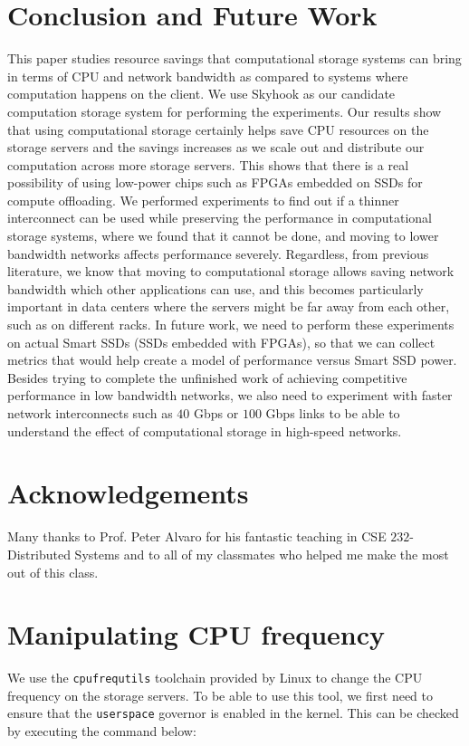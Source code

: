\documentclass[11pt]{article}
\newcommand{\code}[1]{\colorbox{light-gray}{\texttt{#1}}}
\begin{document}
\section{Conclusion and Future Work}
\label{sec:future-and-concl}
This paper studies resource savings that computational storage systems can bring in terms of CPU and network bandwidth as compared to systems where computation happens on the client. We use Skyhook as our candidate computation storage system for performing the experiments. Our results show that using computational storage certainly helps save CPU resources on the storage servers and the savings increases as we scale out and distribute our computation across more storage servers. This shows that there is a real possibility of using low-power chips such as FPGAs embedded on SSDs for compute offloading. We performed experiments to find out if a thinner interconnect can be used while preserving the performance in computational storage systems, where we found that it cannot be done, and moving to lower bandwidth networks affects performance severely. Regardless, from previous literature, we know that moving to computational storage allows saving network bandwidth which other applications can use, and this becomes particularly important in data centers where the servers might be far away from each other, such as on different racks. In future work, we need to perform these experiments on actual Smart SSDs (SSDs embedded with FPGAs), so that we can collect metrics that would help create a model of performance versus Smart SSD power. Besides trying to complete the unfinished work of achieving competitive performance in low bandwidth networks, we also need to experiment with faster network interconnects such as $40$ Gbps or $100$ Gbps links to be able to understand the effect of computational storage in high-speed networks.

\section{Acknowledgements}
Many thanks to Prof. Peter Alvaro for his fantastic teaching in CSE $232$-Distributed Systems and to all of my classmates who helped me make the most out of this class.




\appendix

\section{Manipulating CPU frequency}
\label{sec:app-cpu}
We use the \code{cpufrequtils} toolchain provided by Linux to change the CPU frequency on the storage servers. To be able to use this tool, we first need to ensure that the \code{userspace} governor is enabled in the kernel. This can be checked by executing the command below:
\end{document}
